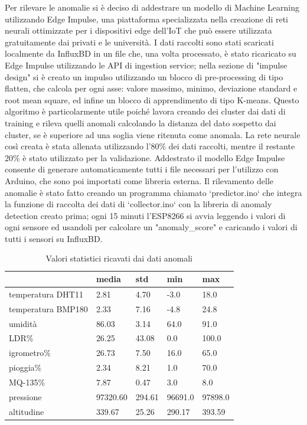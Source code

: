 \documentclass[fleqn, 12pt]{SelfArx}
\begin{document}
Per rilevare le anomalie si è deciso di addestrare un modello di Machine Learning utilizzando Edge Impulse\cite{edgeimpulse}, una piattaforma specializzata nella creazione di reti neurali ottimizzate per i dispositivi edge dell'IoT che
può essere utilizzata gratuitamente dai privati e le università. I dati raccolti sono stati scaricati localmente da InfluxBD in un file che, una volta processato, è stato ricaricato su Edge Impulse utilizzando le API di 
ingestion service\cite{eiapi}; nella sezione di "impulse design" si è creato un impulso utilizzando un blocco di pre-processing di tipo flatten, che calcola per ogni asse: valore massimo, 
minimo, deviazione standard e root mean square, ed infine un blocco di apprendimento di tipo K-means. Questo algoritmo è particolarmente utile poiché lavora creando dei cluster dai dati di training e rileva quelli anomali
calcolando la distanza del dato sospetto dai cluster, se è superiore ad una soglia viene ritenuta come anomala.
La rete neurale così creata è stata allenata utilizzando l'80\% dei dati raccolti, mentre il restante 20\% è stato utilizzato per la validazione. Addestrato il modello Edge Impulse consente di generare automaticamente
tutti i file necessari per l'utilizzo con Arduino, che sono poi importati come libreria esterna. Il rilevamento delle anomalie è stato fatto creando un programma chiamato `predictor.ino` che integra la funzione di raccolta 
dei dati di `collector.ino` con la libreria di anomaly detection creato prima; ogni 15 minuti l'ESP8266 si avvia leggendo i valori di ogni sensore ed usandoli per calcolare un "anomaly\_score" e caricando i valori di tutti i 
sensori su InfluxBD.

\begin{table}[h!]
  \centering
  \begin{tabular}{ l l l l l }
    \hline
     & media & std & min & max \\
    \hline
    temperatura DHT11 & 2.81 & 4.70 & -3.0 & 18.0 \\
    temperatura BMP180 & 2.33 & 7.16 & -4.8 & 24.8 \\
    umidità & 86.03 & 3.14 & 64.0 & 91.0 \\
    LDR\% & 26.25 & 43.08 & 0.0 & 100.0 \\
    igrometro\% & 26.73 & 7.50 & 16.0 & 65.0 \\
    pioggia\% & 2.34 & 8.21 & 1.0 & 70.0 \\
    MQ-135\% & 7.87 & 0.47 & 3.0 & 8.0 \\
    pressione & 97320.60 & 294.61 & 96691.0 & 97898.0 \\
    altitudine & 339.67 & 25.26 & 290.17 & 393.59 \\
    \hline
  \end{tabular}
  \caption{Valori statistici ricavati dai dati anomali}
  \label{tab:anomalies}
\end{table}
\end{document}
